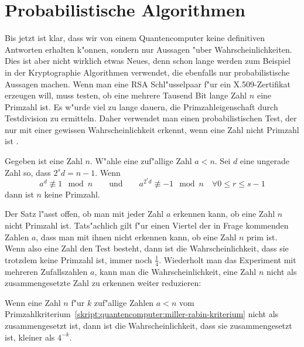 \section{Probabilistische Algorithmen}
Bis jetzt ist klar, dass wir von einem Quantencomputer keine definitiven
Antworten erhalten k"onnen, sondern nur Aussagen "uber Wahrscheinlichkeiten.
Dies ist aber nicht wirklich etwas Neues, denn schon lange werden
zum Beispiel in der Kryptographie Algorithmen verwendet, die ebenfalls
nur probabilistische Aussagen machen.
Wenn man eine RSA Schl"usselpaar f"ur ein X.509-Zertifikat erzeugen will,
muss testen, ob eine mehrere Tausend Bit lange Zahl $n$ eine Primzahl ist.
Es w"urde viel zu lange dauern, die Primzahleigenschaft durch Testdivision 
zu ermitteln.
Daher verwendet man einen probabilistischen Test, der nur mit einer
gewissen Wahrscheinlichkeit erkennt, wenn eine Zahl nicht Primzahl ist
\cite{skript:miller-rabin}.

\begin{satz}
\label{skript:quantencomputer:miller-rabin-kriterium}
Gegeben ist eine Zahl $n$. W"ahle eine zuf"allige Zahl $a<n$. Sei $d$
eine ungerade Zahl so, dass $2^sd=n-1$. Wenn 
\[
a^d\not\equiv 1\mod n
\qquad\text{und}\qquad
a^{2^rd}\not\equiv -1\mod n\quad\forall 0\le r\le s-1
\]
dann ist $n$ keine Primzahl.
\end{satz}

Der Satz l"asst offen, ob man mit jeder Zahl $a$ erkennen kann, ob
eine Zahl $n$ nicht Primzahl ist.
Tats"achlich gilt f"ur einen Viertel der in Frage kommenden Zahlen
$a$, dass man mit ihnen nicht erkennen kann, ob eine Zahl $n$ prim ist.
Wenn also eine Zahl den Test besteht, dann ist die Wahrscheinlichkeit,
dass sie trotzdem keine Primzahl ist, immer noch $\frac14$. Wiederholt
man das Experiment mit mehreren Zufallszahlen $a$, kann man die
Wahrscheinlichkeit, eine Zahl $n$ nicht als zusammengesetzte Zahl zu
erkennen weiter reduzieren:

\begin{satz}
\label{skript:quantencomputer:miller-rabin-test}
Wenn eine Zahl $n$ f"ur $k$ zuf"allige Zahlen $a<n$ vom
Primzahlkriterium~\ref{skript:quantencomputer:miller-rabin-kriterium}
nicht als zusammengesetzt ist, dann ist die Wahrscheinlichkeit,
dass sie zusammengesetzt ist, kleiner als $4^{-k}$.
\end{satz}


